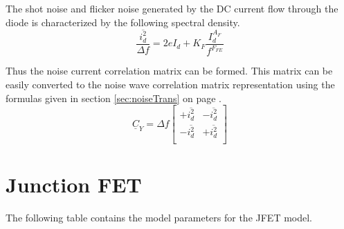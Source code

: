 \documentclass[10pt]{report}
\begin{document}
The shot noise and flicker noise generated by the DC current flow
through the diode is characterized by the following spectral density.
\begin{equation}
\dfrac{\overline{i_{d}^2}}{\Delta f} = 2e I_d + K_F \dfrac{I_d^{A_F}}{f^{F_{FE}}}
\end{equation}

Thus the noise current correlation matrix can be formed.  This matrix
can be easily converted to the noise wave correlation matrix
representation using the formulas given in section
\ref{sec:noiseTrans} on page \pageref{sec:noiseTrans}.
\begin{equation}
\underline{C}_Y = \Delta f
\begin{bmatrix}
+\overline{i_{d}^2} & -\overline{i_{d}^2}\\
-\overline{i_{d}^2} & +\overline{i_{d}^2}\\
\end{bmatrix}
\end{equation}

\section{Junction FET}

The following table contains the model parameters for the JFET model.

\addvspace{12pt}
\end{document}
